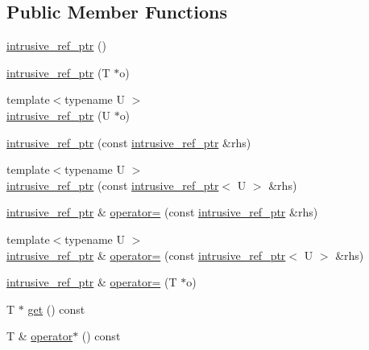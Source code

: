 \subsection*{Public Member Functions}
\begin{DoxyCompactItemize}
\item 
\hyperlink{classmiosix_1_1intrusive__ref__ptr_a90ba1266a44c5e343e7e4f76cdabd9d3}{intrusive\-\_\-ref\-\_\-ptr} ()
\item 
\hyperlink{classmiosix_1_1intrusive__ref__ptr_aa90e4f2cfd44cfd9debe0347bbf23dbd}{intrusive\-\_\-ref\-\_\-ptr} (T $\ast$o)
\item 
{\footnotesize template$<$typename U $>$ }\\\hyperlink{classmiosix_1_1intrusive__ref__ptr_aa196115ec5e223fb88e312bc9590069b}{intrusive\-\_\-ref\-\_\-ptr} (U $\ast$o)
\item 
\hyperlink{classmiosix_1_1intrusive__ref__ptr_af2d9b0d3f64827ff80e7798c5cfb0bdf}{intrusive\-\_\-ref\-\_\-ptr} (const \hyperlink{classmiosix_1_1intrusive__ref__ptr}{intrusive\-\_\-ref\-\_\-ptr} \&rhs)
\item 
{\footnotesize template$<$typename U $>$ }\\\hyperlink{classmiosix_1_1intrusive__ref__ptr_a04ba216b6085adcf33bf98ca09c69b8a}{intrusive\-\_\-ref\-\_\-ptr} (const \hyperlink{classmiosix_1_1intrusive__ref__ptr}{intrusive\-\_\-ref\-\_\-ptr}$<$ U $>$ \&rhs)
\item 
\hyperlink{classmiosix_1_1intrusive__ref__ptr}{intrusive\-\_\-ref\-\_\-ptr} \& \hyperlink{classmiosix_1_1intrusive__ref__ptr_a97850214e47356f5ed505eda0629e8e9}{operator=} (const \hyperlink{classmiosix_1_1intrusive__ref__ptr}{intrusive\-\_\-ref\-\_\-ptr} \&rhs)
\item 
{\footnotesize template$<$typename U $>$ }\\\hyperlink{classmiosix_1_1intrusive__ref__ptr}{intrusive\-\_\-ref\-\_\-ptr} \& \hyperlink{classmiosix_1_1intrusive__ref__ptr_abacfd437cfff16c20e24113c3efa5e75}{operator=} (const \hyperlink{classmiosix_1_1intrusive__ref__ptr}{intrusive\-\_\-ref\-\_\-ptr}$<$ U $>$ \&rhs)
\item 
\hyperlink{classmiosix_1_1intrusive__ref__ptr}{intrusive\-\_\-ref\-\_\-ptr} \& \hyperlink{classmiosix_1_1intrusive__ref__ptr_aab8558f7cfea4a1e76dc553392c4c6ea}{operator=} (T $\ast$o)
\item 
T $\ast$ \hyperlink{classmiosix_1_1intrusive__ref__ptr_aa72585017bb338ee29ac0f8645af80f3}{get} () const 
\item 
T \& \hyperlink{classmiosix_1_1intrusive__ref__ptr_a43d1966f73cceeed64728e7c326c5350}{operator$\ast$} () const 

\end{DoxyCompactItemize}
